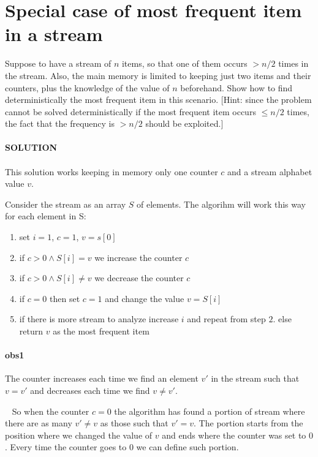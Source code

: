 \documentclass[a4paper]{article}
\begin{document}
\section*{Special case of most frequent item in a stream}
Suppose to have a stream of $n$ items, so that one of them occurs $> n/2$ times in the stream. Also, the main memory is limited to keeping just two items and their counters, plus the knowledge of the value of $n$ beforehand. Show how to find deterministically the most frequent item in this scenario. [Hint: since the problem cannot be solved deterministically if the most frequent item occurs $\leq n/2$ times, the fact that the frequency is $> n/2$ should be exploited.]
\\
\\
\textbf{SOLUTION}
\\
\\
This solution works keeping in memory only one counter \textbf{$c$} and a stream alphabet value \textbf{$v$}.

\noindent 
Consider the stream as an array $S$ of elements.
The algorihm will work this way for each element in S:
\begin{enumerate}
\item set $i = 1$, $c = 1$, $v = s[0]$
\item if $c>0 \land S[i] = v$  we increase the counter $c$ 
\item if $c>0 \land S[i] \neq v$ we decrease the counter $c$
\item if $c = 0$ then set $c = 1$ and change the value $v = S[i]$
\item if there is more stream to analyze increase $i$ and repeat from step $2.$ else return $v$ as the most frequent item
\end{enumerate} 


\paragraph{obs1} 
The counter increases each time we find an element $v'$ in the stream such that $v = v'$ and decreases each time we find $v \neq v'$.

\
So when the counter $c = 0$  the algorithm has found a portion of stream where there are as many $v' \neq v$ as those such that $v' = v$.
The portion starts from the position where we changed the value of $v$ and ends where the counter was set to $0$.
Every time the counter goes to $0$ we can define such portion. 
\end{document}
